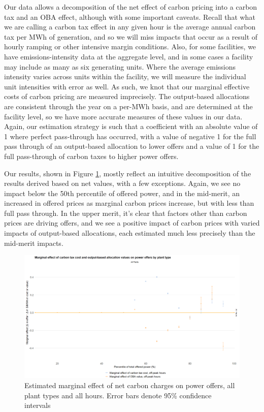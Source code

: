 \documentclass[12pt]{article}
\begin{document}
Our data allows a decomposition of the net effect of carbon pricing into a carbon tax and an OBA effect, although with some important caveats. Recall that what we are calling a carbon tax effect in any given hour is the average annual carbon tax per MWh of generation, and so we will miss impacts that occur as a result of hourly ramping or other intensive margin conditions. Also, for some facilities, we have emissions-intensity data at the aggregate level, and in some cases a facility may include as many as six generating units. Where the average emissions intensity varies across units within the facility, we will measure the individual unit intensities with error as well. As such, we knot that our marginal effective costs of carbon pricing are measured imprecisely. The output-based allocations are consistent through the year on a per-MWh basis, and are determined at the facility level, so we have more accurate measures of these values in our data. Again, our estimation strategy is such that a coefficient with an absolute value of 1 where perfect pass-through has occurred, with a value of negative 1 for the full pass through of an output-based allocation to lower offers and a value of 1 for the full pass-through of carbon taxes to higher power offers.

Our results, shown in Figure \ref{fig:decomp_all_hours}, mostly reflect an intuitive decomposition of the results derived based on net values, with a few exceptions. Again, we see no impact below the 50th percentile of offered power, and in the mid-merit, an increased in offered prices as marginal carbon prices increase, but with less than full pass through. In the upper merit, it's clear that factors other than carbon prices are driving offers, and we see a positive impact of carbon prices with varied impacts of output-based allocations, each estimated much less precisely than the mid-merit impacts.


\begin{figure}[!htb]
    \centering
     \includegraphics[width=.9\textwidth]{../images/all_plants_no_peaks.png}
    \caption{Estimated marginal effect of net carbon charges on power offers, all plant types and all hours. Error bars denote 95\% confidence intervals}
    \label{fig:decomp_all_hours}
\end{figure}
\end{document}

